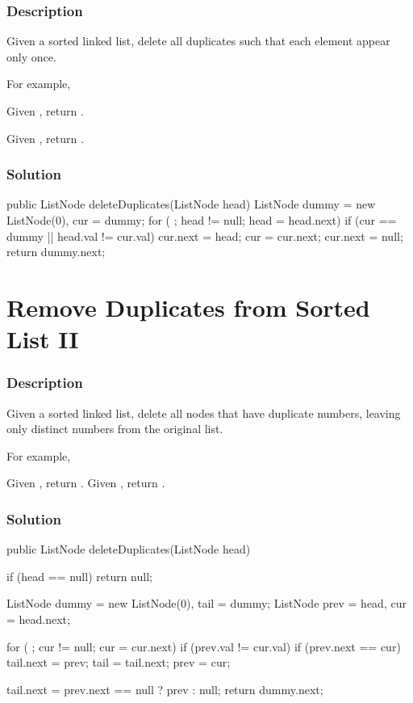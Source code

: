 \subsubsection{Description}
Given a sorted linked list, delete all duplicates such that each element appear only once.

For example,

Given , return .

Given , return .

\subsubsection{Solution}

\begin{Code}
public ListNode deleteDuplicates(ListNode head) {
    ListNode dummy = new ListNode(0), cur = dummy;
    for ( ; head != null; head = head.next) {
        if (cur == dummy || head.val != cur.val) {
            cur.next = head;
            cur = cur.next;
        }
    }
    cur.next = null;
    return dummy.next;
}
\end{Code}

\newpage

\section{Remove Duplicates from Sorted List II} %

\subsubsection{Description}
Given a sorted linked list, delete all nodes that have duplicate numbers, leaving only distinct numbers from the original list.

For example,

Given , return .
Given , return .

\subsubsection{Solution}

\begin{Code}
public ListNode deleteDuplicates(ListNode head) {
    if (head == null) {
        return null;
    }

    ListNode dummy = new ListNode(0), tail = dummy;
    ListNode prev = head, cur = head.next;

    for ( ; cur != null; cur = cur.next) {
        if (prev.val != cur.val) {
            if (prev.next == cur) {
                tail.next = prev;
                tail = tail.next;
            }
            prev = cur;
        }
    }

    tail.next = prev.next == null ? prev : null;
    return dummy.next;
}
\end{Code}


